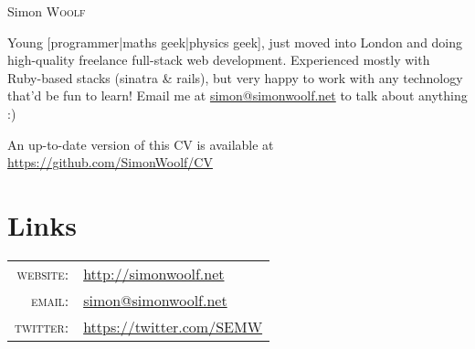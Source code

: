 \documentclass[a4paper,10pt]{article}
\begin{document}
\pagestyle{empty}

\par{\centering
  {\Huge Simon \textsc{Woolf}
}\bigskip\par}

Young [programmer|maths geek|physics geek], just moved into London and doing 
high-quality freelance
full-stack web development. Experienced mostly with Ruby-based stacks (sinatra
\& rails), but very happy to work with any technology that'd be fun to learn!
Email me at \href{mailto:simon@simonwoolf.net}{simon@simonwoolf.net} to talk 
about anything :)

An up-to-date version of this CV is available at \href{https://github.com/SimonWoolf/CV}{https://github.com/SimonWoolf/CV}

\section{Links}

\begin{tabular}{rl}
  \textsc{website:}   & \href{http://simonwoolf.net}{http://simonwoolf.net} \\
  \textsc{email:}     & \href{mailto:simon@simonwoolf.net}{simon@simonwoolf.net} \\
  \textsc{twitter:}   & \href{https://twitter.com/SEMW}{https://twitter.com/SEMW} \\
\end{tabular}
\end{document}
